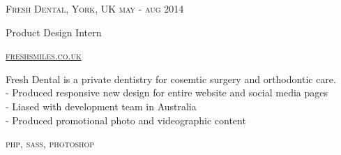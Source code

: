{
  \textsc{\small{Fresh Dental, York, UK
      \hfill
          {\raggedleft
              may - aug 2014
          } \\
      }
  }
  {\raggedright\large {
    Product Design Intern
  } \\}

  \textsc{\small\href{http://www.freshsmiles.co.uk}{freshsmiles.co.uk}}

  \normalsize{
    Fresh Dental is a private dentistry for cosemtic surgery and orthodontic care. \\
    - Produced responsive new design for entire website and social media pages \\
    - Liased with development team in Australia \\
    - Produced promotional photo and videographic content
  }

  \textsc{\small{\color{highlight}
    php,
    sass,
    photoshop
  }}
}
